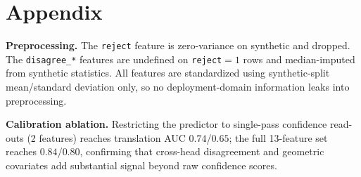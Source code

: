 \documentclass{article}
\begin{document}
\appendix
\section{Appendix}

\textbf{Preprocessing.} The \texttt{reject} feature is zero-variance on synthetic and
dropped. The \texttt{disagree\_*} features are undefined on \texttt{reject}$=1$ rows
and median-imputed from synthetic statistics. All features are standardized using
synthetic-split mean/standard deviation only, so no deployment-domain information
leaks into preprocessing.

\textbf{Calibration ablation.} Restricting the predictor to single-pass confidence
read-outs (2 features) reaches translation AUC $0.74$/$0.65$; the full 13-feature
set reaches $0.84$/$0.80$, confirming that cross-head disagreement and geometric
covariates add substantial signal beyond raw confidence scores.
\end{document}
